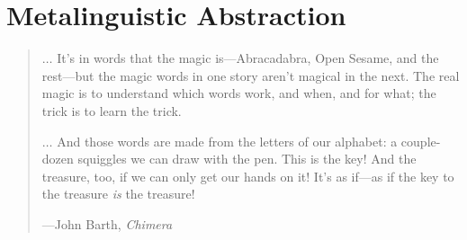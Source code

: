 \chapter{Metalinguistic Abstraction}
\label{Chapter 4}

\begin{quote}
\( \dots \) It's in words that the magic is---Abracadabra, Open Sesame, and the
rest---but the magic words in one story aren't magical in the next.  The real
magic is to understand which words work, and when, and for what; the trick is
to learn the trick.

\( \dots \) And those words are made from the letters of our alphabet: a
couple-dozen squiggles we can draw with the pen.  This is the key!  And the
treasure, too, if we can only get our hands on it!  It's as if---as if the key
to the treasure \emph{is} the treasure!

---John Barth, \textit{Chimera}
\end{quote}


